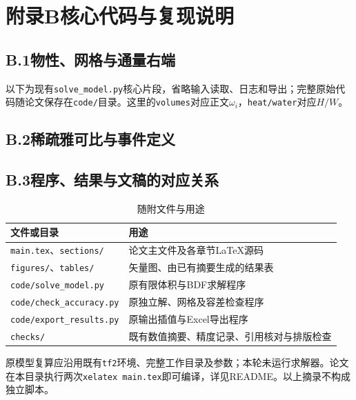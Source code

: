 \section*{附录B\quad 核心代码与复现说明}
\subsection*{B.1\quad 物性、网格与通量右端}
以下为现有\texttt{solve\_model.py}核心片段，省略输入读取、日志和导出；完整原始代码随论文保存在\texttt{code/}目录。这里的\texttt{volumes}对应正文$\omega_i$，\texttt{heat/water}对应$H/W$。


\nextpage
\subsection*{B.2\quad 稀疏雅可比与事件定义}


\subsection*{B.3\quad 程序、结果与文稿的对应关系}
\begin{table}[H]\centering\small
\caption{随附文件与用途}\label{tab:files}
\begin{tabularx}{\linewidth}{lX}
\toprule 文件或目录 & 用途\\\midrule
\texttt{main.tex}、\texttt{sections/} & 论文主文件及各章节LaTeX源码\\
\texttt{figures/}、\texttt{tables/} & 矢量图、由已有摘要生成的结果表\\
\texttt{code/solve\_model.py} & 原有限体积与BDF求解程序\\
\texttt{code/check\_accuracy.py} & 原独立解、网格及容差检查程序\\
\texttt{code/export\_results.py} & 原输出插值与Excel导出程序\\
\texttt{checks/} & 既有数值摘要、精度记录、引用核对与排版检查\\
\bottomrule
\end{tabularx}
\end{table}
\small 原模型复算应沿用既有\texttt{tf2}环境、完整工作目录及参数；本轮未运行求解器。论文在本目录执行两次\texttt{xelatex main.tex}即可编译，详见README。以上摘录不构成独立脚本。

